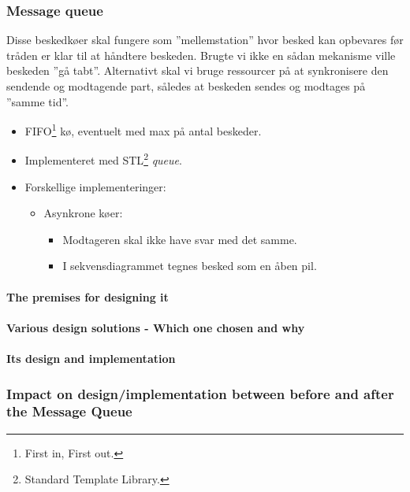 \subsubsection{Message queue}
Disse beskedkøer skal fungere som ''mellemstation'' hvor besked kan opbevares før tråden er klar til at håndtere beskeden. Brugte vi ikke en sådan mekanisme ville beskeden ''gå tabt''. Alternativt skal vi bruge ressourcer på at synkronisere den sendende og modtagende part, således at beskeden sendes og modtages på ''samme tid''.


\begin{itemize}
	\item FIFO\footnote{First in, First out.} kø, eventuelt med max på antal beskeder.
	\item Implementeret med STL\footnote{Standard Template Library.} \textit{queue}.
	\item Forskellige implementeringer:
	\begin{itemize}
		\item Asynkrone køer:
		\begin{itemize}
			\item Modtageren skal ikke have svar med det samme.
			\item I sekvensdiagrammet tegnes besked som en åben pil.
		\end{itemize}
	\end{itemize}
\end{itemize}

\paragraph{The premises for designing it}

\paragraph{Various design solutions - Which one chosen and why}

\paragraph{Its design and implementation}

\subsubsection{Impact on design/implementation between before and after the Message Queue}

